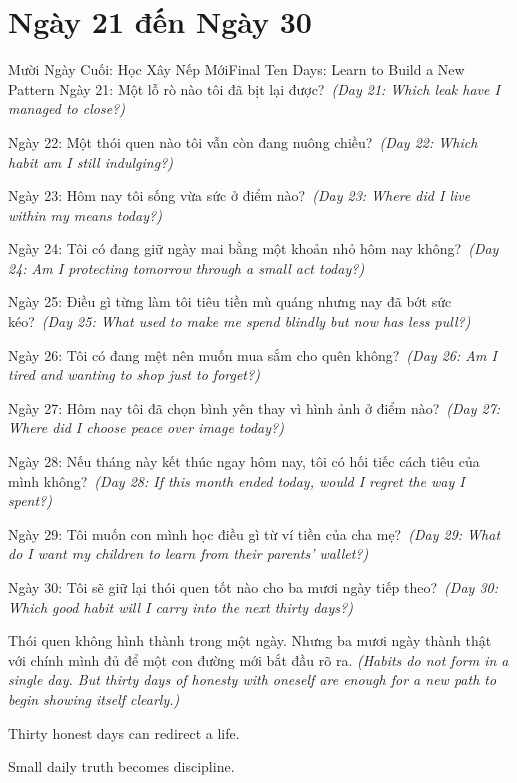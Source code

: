 \section*{Ngày 21 đến Ngày 30}
\begin{truyen}{Mười Ngày Cuối: Học Xây Nếp Mới}{Final Ten Days: Learn to Build a New Pattern}
Ngày 21: Một lỗ rò nào tôi đã bịt lại được?\
\textit{(Day 21: Which leak have I managed to close?)}

Ngày 22: Một thói quen nào tôi vẫn còn đang nuông chiều?\
\textit{(Day 22: Which habit am I still indulging?)}

Ngày 23: Hôm nay tôi sống vừa sức ở điểm nào?\
\textit{(Day 23: Where did I live within my means today?)}

Ngày 24: Tôi có đang giữ ngày mai bằng một khoản nhỏ hôm nay không?\
\textit{(Day 24: Am I protecting tomorrow through a small act today?)}

Ngày 25: Điều gì từng làm tôi tiêu tiền mù quáng nhưng nay đã bớt sức kéo?\
\textit{(Day 25: What used to make me spend blindly but now has less pull?)}

Ngày 26: Tôi có đang mệt nên muốn mua sắm cho quên không?\
\textit{(Day 26: Am I tired and wanting to shop just to forget?)}

Ngày 27: Hôm nay tôi đã chọn bình yên thay vì hình ảnh ở điểm nào?\
\textit{(Day 27: Where did I choose peace over image today?)}

Ngày 28: Nếu tháng này kết thúc ngay hôm nay, tôi có hối tiếc cách tiêu của mình không?\
\textit{(Day 28: If this month ended today, would I regret the way I spent?)}

Ngày 29: Tôi muốn con mình học điều gì từ ví tiền của cha mẹ?\
\textit{(Day 29: What do I want my children to learn from their parents’ wallet?)}

Ngày 30: Tôi sẽ giữ lại thói quen tốt nào cho ba mươi ngày tiếp theo?\
\textit{(Day 30: Which good habit will I carry into the next thirty days?)}
\end{truyen}

\begin{baihoc}
Thói quen không hình thành trong một ngày. Nhưng ba mươi ngày thành thật với chính mình đủ để một con đường mới bắt đầu rõ ra.
\textit{(Habits do not form in a single day. But thirty days of honesty with oneself are enough for a new path to begin showing itself clearly.)}
\end{baihoc}

\begin{ghinhoanh}
Thirty honest days can redirect a life.

Small daily truth becomes discipline.
\end{ghinhoanh}

\ngancach
